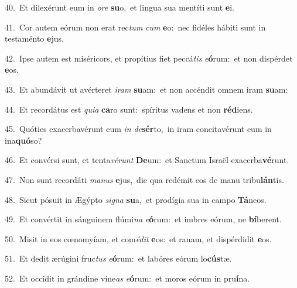 {\numbfont\textcolor{\numbcolor}{40.}}~Et dilexérunt eum in \textit{o}\-\textit{re} \textbf{su}\-o,~\star et lingua sua mentíti sunt \textbf{e}\-i.\par
{\numbfont\textcolor{\numbcolor}{41.}}~Cor autem eórum non erat rec\textit{tum} \textit{cum} \textbf{e}\-o:~\star nec fidéles hábiti sunt in testaménto \textbf{e}\-jus.\par
{\numbfont\textcolor{\numbcolor}{42.}}~Ipse autem est miséricors, et propítius fiet peccá\textit{tis} \textit{e}\-\textbf{ó}rum:~\star et non dispérdet \textbf{e}\-os.\par
{\numbfont\textcolor{\numbcolor}{43.}}~Et abundávit ut avérteret \textit{i}\-\textit{ram} \textbf{su}\-am:~\star et non accéndit omnem iram \textbf{su}\-am:\par
{\numbfont\textcolor{\numbcolor}{44.}}~Et recordátus est \textit{qui}\-\textit{a} \textbf{ca}\-ro sunt:~\star spíritus vadens et non \textbf{réd}\-iens.\par
{\numbfont\textcolor{\numbcolor}{45.}}~Quóties exacerbavérunt eum \textit{in} \textit{de}\-\textbf{sér}to,~\star in iram concitavérunt eum in ina\-\textbf{quó}\-so?\par
{\numbfont\textcolor{\numbcolor}{46.}}~Et convérsi sunt, et tenta\-\textit{vé}\-\textit{runt} \textbf{De}\-um:~\star et Sanctum Israël exacerba\-\textbf{vé}\-runt.\par
{\numbfont\textcolor{\numbcolor}{47.}}~Non sunt recordáti \textit{ma}\-\textit{nus} \textbf{e}\-jus,~\star die qua redémit eos de manu tribu\-\textbf{lán}\-tis.\par
{\numbfont\textcolor{\numbcolor}{48.}}~Sicut pósuit in Ægýpto \textit{si}\-\textit{gna} \textbf{su}\-a,~\star et prodígia sua in campo \textbf{Tá}\-neos.\par
{\numbfont\textcolor{\numbcolor}{49.}}~Et convértit in sánguinem flúmi\textit{na} \textit{e}\-\textbf{ó}rum:~\star et imbres eórum, ne \textbf{bí}\-berent.\par
{\numbfont\textcolor{\numbcolor}{50.}}~Misit in eos cœnomyíam, et com\-\textit{é}\-\textit{dit} \textbf{e}\-os:~\star et ranam, et dispérdidit \textbf{e}\-os.\par
{\numbfont\textcolor{\numbcolor}{51.}}~Et dedit ærúgini fruc\textit{tus} \textit{e}\-\textbf{ó}rum:~\star et labóres eórum lo\-\textbf{cús}\-tæ.\par
{\numbfont\textcolor{\numbcolor}{52.}}~Et occídit in grándine víne\textit{as} \textit{e}\-\textbf{ó}rum:~\star et moros eórum in pru\-\textbf{í}\-na.\par
